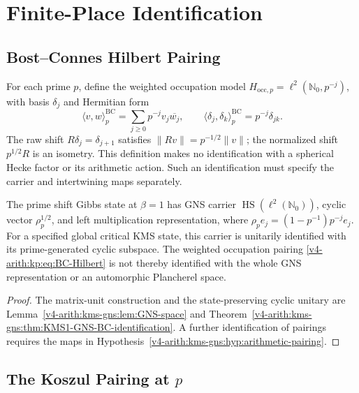 \section{Finite-Place Identification}
\label{v4-arith:kp:finite}

\subsection{Bost--Connes Hilbert Pairing}
\label{v4-arith:kp:finite:BC-Hilbert}

For each prime \(p\), define the weighted occupation model
\(H_{\mathrm{occ},p}=\ell^2(\mathbb N_0,p^{-j})\), with basis
\(\delta_j\) and Hermitian form
\begin{equation}
\label{v4-arith:kp:eq:BC-Hilbert}
 \langle v,w\rangle^{\mathrm{BC}}_p
 =\sum_{j\geq0}p^{-j}v_j\overline{w_j},\qquad
 \langle\delta_j,\delta_k\rangle^{\mathrm{BC}}_p
 =p^{-j}\delta_{jk}.
\end{equation}
The raw shift \(R\delta_j=\delta_{j+1}\) satisfies
\(\|Rv\|=p^{-1/2}\|v\|\); the normalized shift \(p^{1/2}R\)
is an isometry. This definition makes no identification with a
spherical Hecke factor or its arithmetic action. Such an identification
must specify the carrier and intertwining maps separately.

\begin{lemma}
\label{v4-arith:kp:lem:GNS}
The prime shift Gibbs state at \(\beta=1\) has GNS carrier
\(\operatorname{HS}(\ell^2(\mathbb N_0))\), cyclic vector
\(\rho_p^{1/2}\), and left multiplication representation, where
\(\rho_p e_j=(1-p^{-1})p^{-j}e_j\).
For a specified global critical KMS state, this carrier is
unitarily identified with its prime-generated cyclic subspace.
The weighted occupation pairing
\eqref{v4-arith:kp:eq:BC-Hilbert} is not thereby identified with the
whole GNS representation or an automorphic Plancherel space.
\end{lemma}
\begin{proof}
The matrix-unit construction and the state-preserving cyclic
unitary are Lemma~\ref{v4-arith:kms-gns:lem:GNS-space} and
Theorem~\ref{v4-arith:kms-gns:thm:KMS1-GNS-BC-identification}.
A further identification of pairings requires the maps in
Hypothesis~\ref{v4-arith:kms-gns:hyp:arithmetic-pairing}.
\end{proof}

\subsection{The Koszul Pairing at \texorpdfstring{\(p\)}{p}}
\label{v4-arith:kp:finite:Koszul-p}

